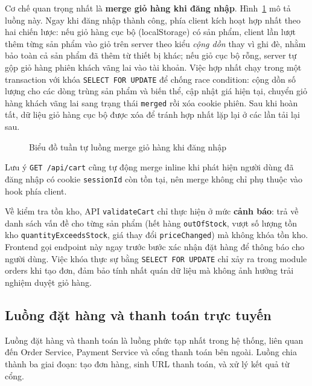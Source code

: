 \begin{sloppypar}
Cơ chế quan trọng nhất là \textbf{merge giỏ hàng khi đăng nhập}. Hình~\ref{fig:seq_cart_merge} mô tả luồng này. Ngay khi đăng nhập thành công, phía client kích hoạt hợp nhất theo hai chiến lược: nếu giỏ hàng cục bộ (localStorage) có sản phẩm, client lần lượt thêm từng sản phẩm vào giỏ trên server theo kiểu \textit{cộng dồn} thay vì ghi đè, nhằm bảo toàn cả sản phẩm đã thêm từ thiết bị khác; nếu giỏ cục bộ rỗng, server tự gộp giỏ hàng phiên khách vãng lai vào tài khoản. Việc hợp nhất chạy trong một transaction với khóa \texttt{SELECT FOR UPDATE} để chống race condition: cộng dồn số lượng cho các dòng trùng sản phẩm và biến thể, cập nhật giá hiện tại, chuyển giỏ hàng khách vãng lai sang trạng thái \texttt{merged} rồi xóa cookie phiên. Sau khi hoàn tất, dữ liệu giỏ hàng cục bộ được xóa để tránh hợp nhất lặp lại ở các lần tải lại sau.
\end{sloppypar}

\begin{figure}[H]
  \centering
  \caption{Biểu đồ tuần tự luồng merge giỏ hàng khi đăng nhập}
  \label{fig:seq_cart_merge}
\end{figure}

Lưu ý \texttt{GET /api/cart} cũng tự động merge inline khi phát hiện người dùng đã đăng nhập có cookie \texttt{sessionId} còn tồn tại, nên merge không chỉ phụ thuộc vào hook phía client.

Về kiểm tra tồn kho, API \texttt{validateCart} chỉ thực hiện ở mức \textbf{cảnh báo}: trả về danh sách vấn đề cho từng sản phẩm (hết hàng \texttt{outOfStock}, vượt số lượng tồn kho \texttt{quantityExceedsStock}, giá thay đổi \texttt{priceChanged}) mà không khóa tồn kho. Frontend gọi endpoint này ngay trước bước xác nhận đặt hàng để thông báo cho người dùng. Việc khóa thực sự bằng \texttt{SELECT FOR UPDATE} chỉ xảy ra trong module orders khi tạo đơn, đảm bảo tính nhất quán dữ liệu mà không ảnh hưởng trải nghiệm duyệt giỏ hàng.

\subsection{Luồng đặt hàng và thanh toán trực tuyến}

Luồng đặt hàng và thanh toán là luồng phức tạp nhất trong hệ thống, liên quan đến Order Service, Payment Service và cổng thanh toán bên ngoài. Luồng chia thành ba giai đoạn: tạo đơn hàng, sinh URL thanh toán, và xử lý kết quả từ cổng.

